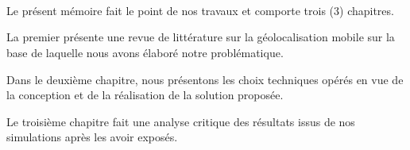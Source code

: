     \paragraph{\\}
	\small{
	  Le présent mémoire fait le point de nos travaux et comporte trois (3) chapitres.
	
	  La premier présente une revue de littérature sur la géolocalisation mobile
      sur la base de laquelle nous avons élaboré notre problématique.
    
	  Dans le deuxième chapitre, nous présentons les choix techniques opérés en
      vue de la conception et de la réalisation de la solution proposée.
    
	  Le troisième chapitre fait une analyse critique des résultats issus de nos simulations 
      après les avoir exposés.
	}


